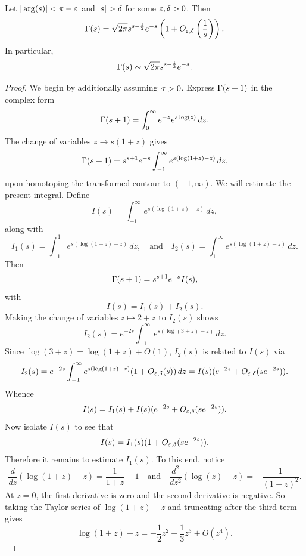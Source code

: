     \begin{theorem*}
      Let \(|\arg(s)| < \pi-\varepsilon\) and \(|s| > \delta\) for some \(\varepsilon,\delta > 0\). Then
      \[
        \Gamma(s) = \sqrt{2\pi}s^{s-\frac{1}{2}}e^{-s}\left(1+O_{\varepsilon,\delta}\left(\frac{1}{s}\right)\right).
      \]
      In particular,
      \[
        \Gamma(s) \sim \sqrt{2\pi}s^{s-\frac{1}{2}}e^{-s}.
      \]
    \end{theorem*}
    \begin{proof}
      We begin by additionally assuming \(\sigma > 0\). Express \(\Gamma(s+1)\) in the complex form
      \[
        \Gamma(s+1) = \int_{0}^{\infty}e^{-z}e^{s\log(z)}\,dz.
      \]
      The change of variables \(z \to s(1+z)\) gives
      \[
        \Gamma(s+1) = s^{s+1}e^{-s}\int_{-1}^{\infty}e^{s(\log(1+z)-z)}\,dz,
      \]
      upon homotoping the transformed contour to \((-1,\infty)\). We will estimate the present integral. Define
      \[
        I(s) = \int_{-1}^{\infty}e^{s(\log(1+z)-z)}\,dz,
      \]
      along with
      \[
        I_{1}(s) = \int_{-1}^{1}e^{s(\log(1+z)-z)}\,dz, \quad \text{and} \quad I_{2}(s) = \int_{1}^{\infty}e^{s(\log(1+z)-z)}\,dz.
      \]
      Then
      \begin{equation}\label{equ:Stirlings_formula_1}
        \Gamma(s+1) = s^{s+1}e^{-s}I(s),
      \end{equation}
      with
      \[
        I(s) = I_{1}(s)+I_{2}(s).
      \]
      Making the change of variables \(z \mapsto 2+z\) to \(I_{2}(s)\) shows
      \[
        I_{2}(s) = e^{-2s}\int_{-1}^{\infty}e^{s(\log(3+z)-z)}\,dz.
      \]
      Since \(\log(3+z) = \log(1+z)+O(1)\), \(I_{2}(s)\) is related to \(I(s)\) via
      \[
        I_{2}(s) = e^{-2s}\int_{-1}^{\infty}e^{s(\log(1+z)-z)}(1+O_{\varepsilon,\delta}(s))\,dz = I(s)(e^{-2s}+O_{\varepsilon,\delta}(se^{-2s})).
      \]
      Whence
      \[
        I(s) = I_{1}(s)+I(s)(e^{-2s}+O_{\varepsilon,\delta}(se^{-2s})).
      \]
      Now isolate \(I(s)\) to see that
      \begin{equation}\label{equ:Stirlings_formula_2}
        I(s) = I_{1}(s)(1+O_{\varepsilon,\delta}(se^{-2s})).
      \end{equation}
      Therefore it remains to estimate \(I_{1}(s)\). To this end, notice
      \[
        \frac{d}{dz}(\log(1+z)-z) = \frac{1}{1+z}-1 \quad \text{and} \quad \frac{d^{2}}{dz^{2}}(\log(z)-z) = -\frac{1}{(1+z)^{2}}.
      \]
      At \(z = 0\), the first derivative is zero and the second derivative is negative. So taking the Taylor series of \(\log(1+z)-z\) and truncating after the third term gives
      \[
        \log(1+z)-z = -\frac{1}{2}z^{2}+\frac{1}{3}z^{3}+O(z^{4}).
\]
\end{proof}
